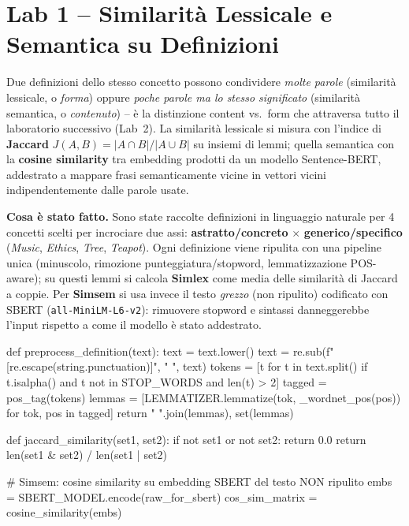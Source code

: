 \documentclass[11pt,a4paper]{article}
\begin{document}
\section{Lab 1 -- Similarità Lessicale e Semantica su Definizioni}

\begin{theorybox}
Due definizioni dello stesso concetto possono condividere \emph{molte parole} (similarità lessicale, o \emph{forma}) oppure \emph{poche parole ma lo stesso significato} (similarità semantica, o \emph{contenuto}) -- è la distinzione content vs.\ form che attraversa tutto il laboratorio successivo (Lab~2). La similarità lessicale si misura con l'indice di \textbf{Jaccard} $J(A,B)=|A\cap B|/|A\cup B|$ su insiemi di lemmi; quella semantica con la \textbf{cosine similarity} tra embedding prodotti da un modello Sentence-BERT, addestrato a mappare frasi semanticamente vicine in vettori vicini indipendentemente dalle parole usate.
\end{theorybox}

\textbf{Cosa è stato fatto.} Sono state raccolte definizioni in linguaggio naturale per 4 concetti scelti per incrociare due assi: \textbf{astratto/concreto} $\times$ \textbf{generico/specifico} (\textit{Music}, \textit{Ethics}, \textit{Tree}, \textit{Teapot}). Ogni definizione viene ripulita con una pipeline unica (minuscolo, rimozione punteggiatura/stopword, lemmatizzazione POS-aware); su questi lemmi si calcola \textbf{Simlex} come media delle similarità di Jaccard a coppie. Per \textbf{Simsem} si usa invece il testo \emph{grezzo} (non ripulito) codificato con SBERT (\texttt{all-MiniLM-L6-v2}): rimuovere stopword e sintassi danneggerebbe l'input rispetto a come il modello è stato addestrato.

\begin{pylisting}[title={Pipeline di preprocessing e le due metriche di similarità}]
def preprocess_definition(text):
    text = text.lower()
    text = re.sub(f"[{re.escape(string.punctuation)}]", " ", text)
    tokens = [t for t in text.split() if t.isalpha()
              and t not in STOP_WORDS and len(t) > 2]
    tagged = pos_tag(tokens)
    lemmas = [LEMMATIZER.lemmatize(tok, _wordnet_pos(pos))
              for tok, pos in tagged]
    return " ".join(lemmas), set(lemmas)

def jaccard_similarity(set1, set2):
    if not set1 or not set2:
        return 0.0
    return len(set1 & set2) / len(set1 | set2)

# Simsem: cosine similarity su embedding SBERT del testo NON ripulito
embs = SBERT_MODEL.encode(raw_for_sbert)
cos_sim_matrix = cosine_similarity(embs)
\end{pylisting}
\end{document}
